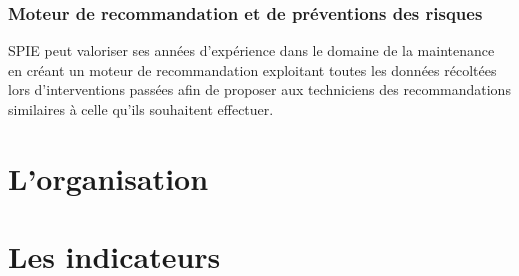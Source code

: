     \subsubsection{Moteur de recommandation et de préventions des risques}

        SPIE peut valoriser ses années d'expérience dans le domaine de la maintenance en créant un moteur de recommandation exploitant toutes les données récoltées lors d'interventions passées afin de proposer aux techniciens des recommandations similaires à celle qu'ils souhaitent effectuer.

\section{L'organisation}

\section{Les indicateurs}

